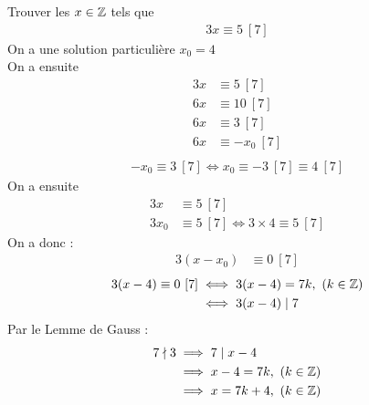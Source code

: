 \begin{exemple}
Trouver les $x \in \mathbb{Z}$ tels que 
\begin{align*}
3x \equiv 5 \ [7]
\end{align*}
On a une solution particulière $x_0 = 4$
\\
On a ensuite
\begin{align*}
3x &\equiv 5 \ [7] \\
6x &\equiv 10 \ [7] \\
6x &\equiv 3 \ [7] \\
6x &\equiv -x_0 \ [7] \\
\end{align*}
\begin{align*}
-x_0 \equiv 3 \ [7] \iff x_0 \equiv -3 \ [7] \equiv 4 \ [7]
\end{align*}
On a ensuite 
\begin{align*}
3x &\equiv 5 \ [7] \\
3x_0 &\equiv 5 \ [7] \iff 3 \times 4 \equiv 5 \ [7]
\end{align*}
On a donc :
\begin{align*}
3(x - x_0) &\equiv 0 \ [7] 
\end{align*}
\begin{align*}
3(x - 4) \equiv 0 \ [7] &\iff 3(x - 4) = 7k,\ (k \in \mathbb{Z}) \\
						&\iff 3(x - 4) \mid 7 \\
\end{align*}
Par le Lemme de Gauss :
\begin{align*}
7 \nmid 3 &\implies 7 \mid x - 4 \\
		  &\implies x - 4 = 7k,\ (k \in \mathbb{Z}) \\
		  &\implies x = 7k + 4,\ (k \in \mathbb{Z})
\end{align*}
\end{exemple}